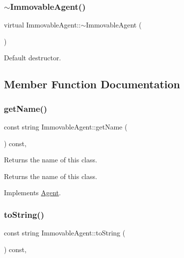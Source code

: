 \subsubsection{\texorpdfstring{$\sim$\+Immovable\+Agent()}{~ImmovableAgent()}}
{\footnotesize\ttfamily virtual Immovable\+Agent\+::$\sim$\+Immovable\+Agent (\begin{DoxyParamCaption}{ }\end{DoxyParamCaption})\hspace{0.3cm}{\ttfamily [virtual]}}

Default destructor. 

\subsection{Member Function Documentation}
\mbox{\label{class_immovable_agent_ae8fbccc744f6f806e47dfd242fa67a1c}} 
\subsubsection{\texorpdfstring{get\+Name()}{getName()}}
{\footnotesize\ttfamily const string Immovable\+Agent\+::get\+Name (\begin{DoxyParamCaption}{ }\end{DoxyParamCaption}) const\hspace{0.3cm}{\ttfamily [override]}, {\ttfamily [virtual]}}

Returns the name of this class. \begin{DoxyReturn}{Returns}
the name of this class. 
\end{DoxyReturn}


Implements \hyperlink{class_agent_afe6c72d91baf9ee4fe77ea1ed7fef3ba}{Agent}.

\mbox{\label{class_immovable_agent_a805b0d18035550d902d617a8c7ccc062}} 
\subsubsection{\texorpdfstring{to\+String()}{toString()}}
{\footnotesize\ttfamily const string Immovable\+Agent\+::to\+String (\begin{DoxyParamCaption}{ }\end{DoxyParamCaption}) const\hspace{0.3cm}{\ttfamily [override]}, {\ttfamily [virtual]}}

